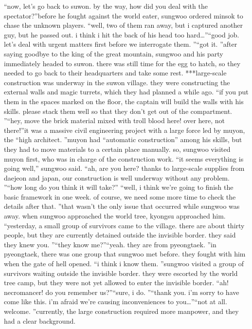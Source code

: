 “now, let’s go back to suwon.
 by the way, how did you deal with the spectator?”before he fought against the world eater, sungwoo ordered minsok to chase the unknown players.
“well, two of them ran away, but i captured another guy, but he passed out.
 i think i hit the back of his head too hard…”“good job.
 let’s deal with urgent matters first before we interrogate them.
”“got it.
”after saying goodbye to the king of the great mountain, sungwoo and his party immediately headed to suwon.
there was still time for the egg to hatch, so they needed to go back to their headquarters and take some rest.
***large-scale construction was underway in the suwon village.
 they were constructing the external walls and magic turrets, which they had planned a while ago.
“if you put them in the spaces marked on the floor, the captain will build the walls with his skills.
 please stack them well so that they don’t get out of the compartment.
”“hey, move the brick material mixed with troll blood here! over here, not there!”it was a massive civil engineering project with a large force led by muyon, the “high architect.
”muyon had “automatic construction” among his skills, but they had to move materials to a certain place manually.
so, sungwoo visited muyon first, who was in charge of the construction work.
“it seems everything is going well,” sungwoo said.
“ah, are you here? thanks to large-scale supplies from daejeon and japan, our construction is well underway without any problem.
”“how long do you think it will take?”
“well, i think we’re going to finish the basic framework in one week.
 of course, we need some more time to check the details after that.
”that wasn’t the only issue that occurred while sungwoo was away.
when sungwoo approached the world tree, kyongsu approached him.
“yesterday, a small group of survivors came to the village.
 there are about thirty people, but they are currently detained outside the invisible border.
 they said they knew you.
”“they know me?”“yeah.
 they are from pyeongtaek.
”in pyeongtaek, there was one group that sungwoo met before.
 they fought with him when the gate of hell opened.
“i think i know them.
”sungwoo visited a group of survivors waiting outside the invisible border.
 they were escorted by the world tree camp, but they were not yet allowed to enter the invisible border.
“ah! necromancer! do you remember us?”“sure, i do.
”“thank you.
 i’m sorry to have come like this.
 i’m afraid we’re causing inconveniences to you…”“not at all.
 welcome.
”currently, the large construction required more manpower, and they had a clear background.
